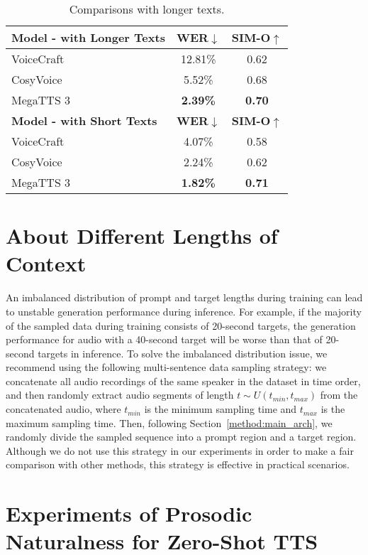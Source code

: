 \begin{table*}[!ht]
\small
\centering
\begin{tabular}{@{}l|cc@{}}
\toprule
\bfseries Model - with Longer Texts & \bfseries WER$\downarrow$ & \bfseries SIM-O$\uparrow$ \\       
\midrule
VoiceCraft      &  12.81\% & 0.62  \\
CosyVoice       &  5.52\%  & 0.68 \\
MegaTTS 3           &  \bfseries 2.39\%  & \bfseries 0.70 \\
\midrule
\midrule
\bfseries Model - with Short Texts & \bfseries WER$\downarrow$ & \bfseries SIM-O$\uparrow$ \\  
\midrule
VoiceCraft       &  4.07\%   & 0.58 \\
CosyVoice      &  2.24\%   & 0.62 \\
MegaTTS 3           &  \bfseries 1.82\%   & \bfseries 0.71  \\
\bottomrule
\end{tabular}
\caption{Comparisons with longer texts.}
\label{table:cmp_longer_samples}
\end{table*}


\section{About Different Lengths of Context}
An imbalanced distribution of prompt and target lengths during training can lead to unstable generation performance during inference. For example, if the majority of the sampled data during training consists of 20-second targets, the generation performance for audio with a 40-second target will be worse than that of 20-second targets in inference. To solve the imbalanced distribution issue, we recommend using the following multi-sentence data sampling strategy: we concatenate all audio recordings of the same speaker in the dataset in time order, and then randomly extract audio segments of length $t\sim U(t_{min}, t_{max})$ from the concatenated audio, where $t_{min}$ is the minimum sampling time and $t_{max}$ is the maximum sampling time. Then, following Section~\ref{method:main_arch}, we randomly divide the sampled sequence into a prompt region and a target region. Although we do not use this strategy in our experiments in order to make a fair comparison with other methods, this strategy is effective in practical scenarios.




\section{Experiments of Prosodic Naturalness for Zero-Shot TTS}
\label{app:exp_expressivenees_zs_tts}


